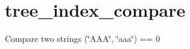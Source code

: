 \hypertarget{tree_index_compare-example}{}\section{tree\+\_\+index\+\_\+compare}
Compare two strings (\char`\"{}\+A\+A\+A\char`\"{}, \char`\"{}aaa\char`\"{}) == 0


\begin{DoxyCodeInclude}
\end{DoxyCodeInclude}
 